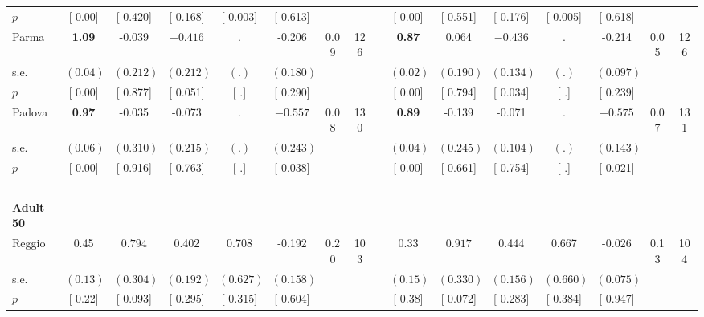 \begin{longtable}{L{8em} c c c c c c c p{1em} c c c c c c c}
\quad \quad \quad \quad $ p$ & [     0.00] & [    0.420] & [    0.168] & [    0.003] & [    0.613] & & & & [     0.00] & [    0.551] & [    0.176] & [    0.005] & [    0.618] & &  \\[1em]
\quad \quad \quad Parma& \textbf{     1.09} &    -0.039 & $ \mathbf{   -0.416}$ &         . &    -0.206 &      0.09 &       126 & & \textbf{     0.87} &     0.064 & $ \mathbf{   -0.436}$ &         . &    -0.214 &      0.05 &       126  \\*
\quad \quad \quad \quad s.e.& $ (     0.04)$ & $ (    0.212)$ & $ (    0.212)$ & $ (        .)$ & $ (    0.180)$ & & & & $ (     0.02)$ & $ (    0.190)$ & $ (    0.134)$ & $ (        .)$ & $ (    0.097)$ & &  \\*
\quad \quad \quad \quad $ p$ & [     0.00] & [    0.877] & [    0.051] & [        .] & [    0.290] & & & & [     0.00] & [    0.794] & [    0.034] & [        .] & [    0.239] & &  \\[1em]
\quad \quad \quad Padova& \textbf{     0.97} &    -0.035 &    -0.073 &         . & $ \mathbf{   -0.557}$ &      0.08 &       130 & & \textbf{     0.89} &    -0.139 &    -0.071 &         . & $ \mathbf{   -0.575}$ &      0.07 &       131  \\*
\quad \quad \quad \quad s.e.& $ (     0.06)$ & $ (    0.310)$ & $ (    0.215)$ & $ (        .)$ & $ (    0.243)$ & & & & $ (     0.04)$ & $ (    0.245)$ & $ (    0.104)$ & $ (        .)$ & $ (    0.143)$ & &  \\*
\quad \quad \quad \quad $ p$ & [     0.00] & [    0.916] & [    0.763] & [        .] & [    0.038] & & & & [     0.00] & [    0.661] & [    0.754] & [        .] & [    0.021] & &  \\[1em]
~\\[1em]
\quad \quad \textbf{Adult 50} & & & & & & & & & & & & & & & \\* 
\quad \quad \quad Reggio& 0.45 & $ \mathbf{    0.794}$ &     0.402 &     0.708 &    -0.192 &      0.20 &       103 & & 0.33 & $ \mathbf{    0.917}$ &     0.444 &     0.667 &    -0.026 &      0.13 &       104  \\*
\quad \quad \quad \quad s.e.& $ (     0.13)$ & $ (    0.304)$ & $ (    0.192)$ & $ (    0.627)$ & $ (    0.158)$ & & & & $ (     0.15)$ & $ (    0.330)$ & $ (    0.156)$ & $ (    0.660)$ & $ (    0.075)$ & &  \\*
\quad \quad \quad \quad $ p$ & [     0.22] & [    0.093] & [    0.295] & [    0.315] & [    0.604] & & & & [     0.38] & [    0.072] & [    0.283] & [    0.384] & [    0.947] & &  \\[1em]

\end{longtable}

